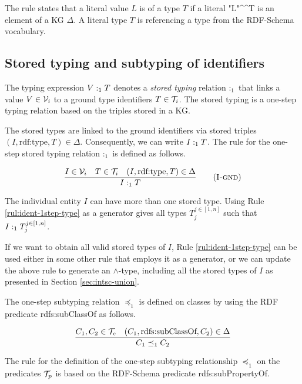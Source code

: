 \documentclass[runningheads]{llncs}
\newcommand{\DD}{{\Delta}}
\newcommand{\V}{{\cal V}}
\newcommand{\TT}{{\cal T}}
\begin{document}
The rule states that a literal value $L$ is of a type $T$ if a literal
"L"\textasciicircum\textasciicircum\/T is an element of a KG
$\Delta$. A literal type $T$ is referencing a type from the RDF-Schema
vocabulary.






\subsection{Stored typing and subtyping of identifiers\label{sec:idents-stored}}

The typing expression $V:_1\/T$ denotes a \emph{stored typing}
relation $:_1$ that links a value $V\in\V_i$ to a ground type
identifiers $T\in\TT_i$. The stored typing is a one-step typing
relation based on the triples stored in a KG.

The stored types are linked to the ground identifiers via stored
triples $(I,\text{rdf:type},T)\in\Delta$. Consequently, we can write
$I:_1\/T$. The rule for the one-step stored typing relation $:_1$ is
defined as follows.

\begin{equation}
\dfrac{I\in\V_i\quad T\in\TT_i\quad (I,\text{rdf:type},T)\in\DD}
      {I :_1 T}
\tag{\textsc{I-gnd}}\label{rule:I-gnd}
\end{equation}

The individual entity $I$ can have more than one stored type. 
Using Rule \ref{rul:ident-1step-type} as a generator gives 
all types $T_j^{j\in[1,n]}$ such that $I:_1\/T_j^{j\in[1,n]}$.

If we want to obtain all valid stored types of $I$, Rule
\ref{rul:ident-1step-type} can be used either in some other rule that
employs it as a generator, or we can update the above rule to generate
an $\land$-type, including all the stored types of $I$ as presented in
Section \ref{sec:intsc-union}.

The one-step subtyping relation $\preceq_1$ is defined on
classes by using the RDF predicate rdfs:sub\-ClassOf as follows.

\begin{equation}
\label{rul:ident-1step-subtype}
\dfrac{C_1,C_2\in\TT_c\quad (C_1,\text{rdfs:subClassOf},C_2)\in\DD}
{C_1 \preceq_1\/C_2}
\end{equation}

The rule for the definition of the one-step subtyping relationship
$\preceq_1$ on the predicates $\TT_p$ is based on the RDF-Schema
predicate rdfs:subPropertyOf.
\end{document}
